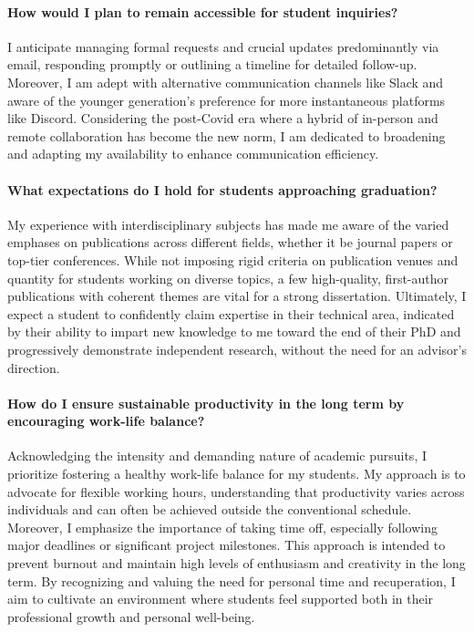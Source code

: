 \paragraph{How would I plan to remain accessible for student inquiries?}
I anticipate managing formal requests and crucial updates predominantly via email, responding promptly or outlining a timeline for detailed follow-up. Moreover, I am adept with alternative communication channels like Slack and aware of the younger generation's preference for more instantaneous platforms like Discord. Considering the post-Covid era where a hybrid of in-person and remote collaboration has become the new norm, I am dedicated to broadening and adapting my availability to enhance communication efficiency.

\paragraph{What expectations do I hold for students approaching graduation?}
My experience with interdisciplinary subjects has made me aware of the varied emphases on publications across different fields, whether it be journal papers or top-tier conferences. While not imposing rigid criteria on publication venues and quantity for students working on diverse topics, a few high-quality, first-author publications with coherent themes are vital for a strong dissertation. Ultimately, I expect a student to confidently claim expertise in their technical area, indicated by their ability to impart new knowledge to me toward the end of their PhD and progressively demonstrate independent research, without the need for an advisor's direction.

\paragraph{How do I ensure sustainable productivity in the long term by encouraging work-life balance?} Acknowledging the intensity and demanding nature of academic pursuits, I prioritize fostering a healthy work-life balance for my students. My approach is to advocate for flexible working hours, understanding that productivity varies across individuals and can often be achieved outside the conventional schedule. Moreover, I emphasize the importance of taking time off, especially following major deadlines or significant project milestones. This approach is intended to prevent burnout and maintain high levels of enthusiasm and creativity in the long term. By recognizing and valuing the need for personal time and recuperation, I aim to cultivate an environment where students feel supported both in their professional growth and personal well-being.\\

